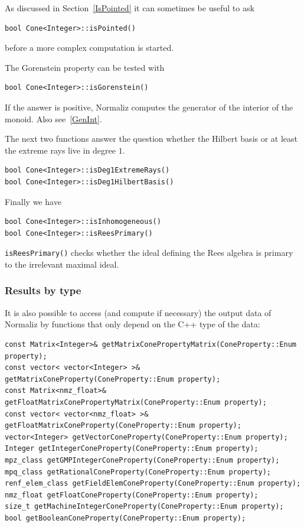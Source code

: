 \begin{small}
As discussed in Section~\ref{IsPointed} it can sometimes be useful to ask
\begin{Verbatim}
bool Cone<Integer>::isPointed()
\end{Verbatim}
before a more complex computation is started.

The Gorenstein property can be tested with
\begin{Verbatim}
bool Cone<Integer>::isGorenstein()
\end{Verbatim}
If the answer is positive, Normaliz computes the generator of the interior of the monoid. Also see~\ref{GenInt}.


The next two functions answer the question whether the Hilbert basis or at least the extreme rays live in degree $1$.
\begin{Verbatim}
bool Cone<Integer>::isDeg1ExtremeRays()
bool Cone<Integer>::isDeg1HilbertBasis()
\end{Verbatim}

Finally we have
\begin{Verbatim}
bool Cone<Integer>::isInhomogeneous()
bool Cone<Integer>::isReesPrimary()
\end{Verbatim}
\verb|isReesPrimary()| checks whether the ideal defining the Rees algebra is primary to the irrelevant maximal ideal.


\subsubsection{Results by type}\label{ByType}

It is also possible to access (and compute if necessary) the output data of Normaliz by functions that only depend on the C++ type of the data:

\begin{Verbatim}
const Matrix<Integer>& getMatrixConePropertyMatrix(ConeProperty::Enum property);
const vector< vector<Integer> >& getMatrixConeProperty(ConeProperty::Enum property);
const Matrix<nmz_float>& getFloatMatrixConePropertyMatrix(ConeProperty::Enum property);
const vector< vector<nmz_float> >& getFloatMatrixConeProperty(ConeProperty::Enum property);
vector<Integer> getVectorConeProperty(ConeProperty::Enum property);
Integer getIntegerConeProperty(ConeProperty::Enum property);
mpz_class getGMPIntegerConeProperty(ConeProperty::Enum property);
mpq_class getRationalConeProperty(ConeProperty::Enum property);
renf_elem_class getFieldElemConeProperty(ConeProperty::Enum property);
nmz_float getFloatConeProperty(ConeProperty::Enum property);
size_t getMachineIntegerConeProperty(ConeProperty::Enum property);
bool getBooleanConeProperty(ConeProperty::Enum property);
\end{Verbatim}


\end{small}
